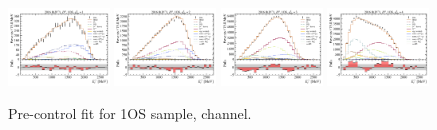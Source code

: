 \begin{figure}[htb]
    \includegraphics[width=0.24\textwidth]{./figs-supplemental-plots/pre-ctrl-fit/lines_q2_slices/fit_result-lines_q2_idx1-D0-1os-el.pdf}
    \includegraphics[width=0.24\textwidth]{./figs-supplemental-plots/pre-ctrl-fit/lines_q2_slices/fit_result-lines_q2_idx2-D0-1os-el.pdf}
    \includegraphics[width=0.24\textwidth]{./figs-supplemental-plots/pre-ctrl-fit/lines_q2_slices/fit_result-lines_q2_idx3-D0-1os-el.pdf}
    \includegraphics[width=0.24\textwidth]{./figs-supplemental-plots/pre-ctrl-fit/lines_q2_slices/fit_result-lines_q2_idx4-D0-1os-el.pdf}

    \caption{Pre-control fit for 1OS sample, \Dz channel.}
    \label{fig:pre-ctrl-1os-d0}
\end{figure}

